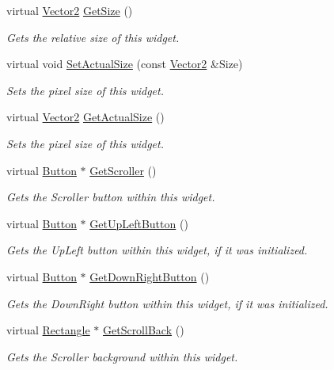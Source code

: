\begin{DoxyCompactItemize}
virtual \hyperlink{classphys_1_1Vector2}{Vector2} \hyperlink{classphys_1_1UI_1_1Scrollbar_aff97ce371ee21fcf3b648dcf8b38e055}{GetSize} ()
\begin{DoxyCompactList}\small\item\em Gets the relative size of this widget. \item\end{DoxyCompactList}\item 
virtual void \hyperlink{classphys_1_1UI_1_1Scrollbar_aabdb8b727f1f84712a5f7c1fca6e830f}{SetActualSize} (const \hyperlink{classphys_1_1Vector2}{Vector2} \&Size)
\begin{DoxyCompactList}\small\item\em Sets the pixel size of this widget. \item\end{DoxyCompactList}\item 
virtual \hyperlink{classphys_1_1Vector2}{Vector2} \hyperlink{classphys_1_1UI_1_1Scrollbar_a2b3d791cbbe4c787f284d8b12a0edf27}{GetActualSize} ()
\begin{DoxyCompactList}\small\item\em Sets the pixel size of this widget. \item\end{DoxyCompactList}\item 
virtual \hyperlink{classphys_1_1UI_1_1Button}{Button} $\ast$ \hyperlink{classphys_1_1UI_1_1Scrollbar_a28024d2f3a017e4ed3c2a4df62a1e8be}{GetScroller} ()
\begin{DoxyCompactList}\small\item\em Gets the Scroller button within this widget. \item\end{DoxyCompactList}\item 
virtual \hyperlink{classphys_1_1UI_1_1Button}{Button} $\ast$ \hyperlink{classphys_1_1UI_1_1Scrollbar_ab298f9747da2eed451ddce8b1a416c15}{GetUpLeftButton} ()
\begin{DoxyCompactList}\small\item\em Gets the UpLeft button within this widget, if it was initialized. \item\end{DoxyCompactList}\item 
virtual \hyperlink{classphys_1_1UI_1_1Button}{Button} $\ast$ \hyperlink{classphys_1_1UI_1_1Scrollbar_abf733d00087050d575fca1abc2d4ba0e}{GetDownRightButton} ()
\begin{DoxyCompactList}\small\item\em Gets the DownRight button within this widget, if it was initialized. \item\end{DoxyCompactList}\item 
virtual \hyperlink{classphys_1_1UI_1_1Rectangle}{Rectangle} $\ast$ \hyperlink{classphys_1_1UI_1_1Scrollbar_a1c24fbb88f9d86aff1b2f0abc033116a}{GetScrollBack} ()
\begin{DoxyCompactList}\small\item\em Gets the Scroller background within this widget. \item\end{DoxyCompactList}\end{DoxyCompactItemize}
